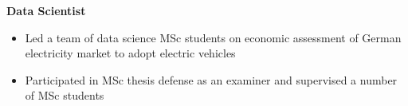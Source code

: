 \documentclass[10pt,letterpaper,sans]{moderncv} %
\begin{document}
\begin{itemize}
	\textbf{\indent Data Scientist}
	\begin{itemize}
		\item Led a team of data science MSc students on economic assessment of German electricity market to adopt electric vehicles
		\item Participated in MSc thesis defense as an examiner and supervised a number of MSc students
	\end{itemize}


%	

%	
%	
	\end{itemize}
	
\end{document}
